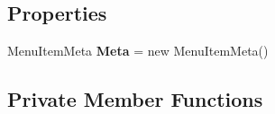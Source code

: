 \subsection*{Properties}
\begin{DoxyCompactItemize}
\item 
\mbox{\label{class_teacher_handbook_1_1_plugins_1_1_feed_1_1_feed_ad6b1451650ec2439f1aee0707514ef63}} 
Menu\+Item\+Meta {\bfseries Meta} = new Menu\+Item\+Meta()
\end{DoxyCompactItemize}
\subsection*{Private Member Functions}
